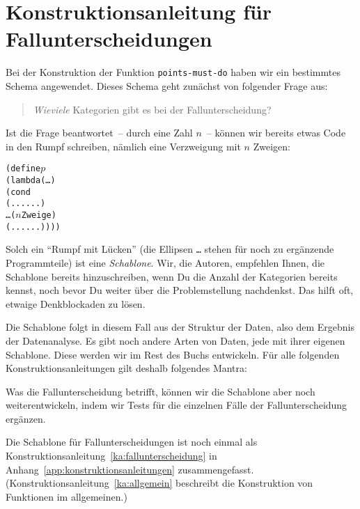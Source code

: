 \begin{mantra}\label{mantra:coverage}
  
\end{mantra}

\section{Konstruktionsanleitung für Fallunterscheidungen}

Bei der Konstruktion der Funktion \texttt{points-must-do} haben wir
ein bestimmtes Schema angewendet.  Dieses Schema geht zunächst von folgender
Frage aus:
%
\begin{quote}
  \emph{Wieviele} Kategorien gibt es bei der Fallunterscheidung?
\end{quote}
%
Ist die Frage beantwortet~-- durch eine Zahl $n$~-- können wir bereits
etwas Code in den Rumpf schreiben, nämlich eine Verzweigung mit $n$
Zweigen:
%
\begin{alltt}
(define \(p\)
  (lambda (\ldots)
    (cond
      (... ...)
      \ldots{}\hspace{1in}\textrm{(\(n\) Zweige)}
      (... ...))))
\end{alltt}
%
Solch ein "`Rumpf mit Lücken"' (die Ellipsen
\texttt{\ldots} stehen für noch zu ergänzende Programmteile) ist eine
\textit{Schablone}.  Wir, die Autoren, empfehlen
Ihnen, die Schablone bereits hinzuschreiben, wenn Du die Anzahl der
Kategorien bereits kennst, noch bevor Du weiter über die
Problemstellung nachdenkst.  Das hilft oft, etwaige Denkblockaden zu
lösen.

Die Schablone folgt in diesem Fall aus der Struktur der Daten, also
dem Ergebnis der Datenanalyse.  Es gibt noch andere Arten von Daten,
jede mit ihrer eigenen Schablone.  Diese werden wir im Rest des Buchs
entwickeln.
Für alle folgenden Konstruktionsanleitungen gilt deshalb folgendes Mantra:

\begin{mantra}[Schablone]\label{mantra:data-analysis}
  
\end{mantra}

Was die Fallunterscheidung betrifft, können wir die Schablone aber
noch weiterentwickeln, indem wir Tests für die einzelnen Fälle der
Fallunterscheidung ergänzen.

Die Schablone für Fallunterscheidungen ist noch einmal
als Konstruktionsanleitung~\ref{ka:fallunterscheidung} in
Anhang~\ref{app:konstruktionsanleitungen} zusammengefasst.
(Konstruktionsanleitung~\ref{ka:allgemein} beschreibt die Konstruktion
von Funktionen im allgemeinen.)

